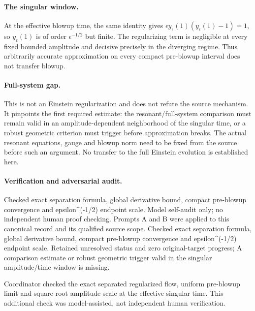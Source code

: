 \documentclass[11pt]{article}
\begin{document}
\paragraph{The singular window.} At the effective blowup time, the same identity gives $\epsilon y_\epsilon(1)(y_\epsilon(1)-1)=1$, so $y_\epsilon(1)$ is of order $\epsilon^{-1/2}$ but finite. The regularizing term is negligible at every fixed bounded amplitude and decisive precisely in the diverging regime. Thus arbitrarily accurate approximation on every compact pre-blowup interval does not transfer blowup.

\paragraph{Full-system gap.} This is not an Einstein regularization and does not refute the source mechanism. It pinpoints the first required estimate: the resonant/full-system comparison must remain valid in an amplitude-dependent neighborhood of the singular time, or a robust geometric criterion must trigger before approximation breaks. The actual resonant equations, gauge and blowup norm need to be fixed from the source before such an argument. No transfer to the full Einstein evolution is established here.

\paragraph{Verification and adversarial audit.}
Checked exact separation formula, global derivative bound, compact pre-blowup convergence and epsilon\textasciicircum{}(-1/2) endpoint scale. Model self-audit only; no independent human proof checking. Prompts A and B were applied to this canonical record and its qualified source scope. Checked exact separation formula, global derivative bound, compact pre-blowup convergence and epsilon\textasciicircum{}(-1/2) endpoint scale. Retained unresolved status and zero original-target progress; A comparison estimate or robust geometric trigger valid in the singular amplitude/time window is missing.

Coordinator checked the exact separated regularized flow, uniform pre-blowup limit and square-root amplitude scale at the effective singular time. This additional check was model-assisted, not independent human verification.
\end{document}
